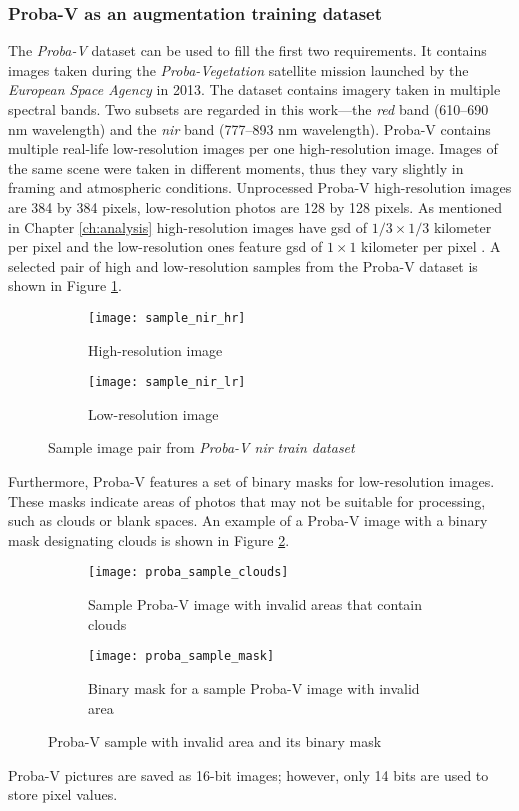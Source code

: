 \subsubsection{Proba-V as an augmentation training dataset}
\label{sec:probav}
The \textit{Proba-V} dataset \cite{esa-proba} can be used to fill the first two requirements.
It contains images taken during the \textit{Proba-Vegetation} satellite mission launched by the \textit{European Space Agency} in 2013.
The dataset contains imagery taken in multiple spectral bands.
Two subsets are regarded in this work---the \textit{\gls{red}} band (610--690 \si{\nano\meter} wavelength) and the \textit{\gls{nir}} band (777--893 \si{\nano\meter} wavelength).
Proba-V contains multiple real-life low-resolution images per one high-resolution image.
Images of the same scene were taken in different moments, thus they vary slightly in framing and atmospheric conditions.
Unprocessed Proba-V high-resolution images are 384 by 384 pixels, low-resolution photos are 128 by 128 pixels.
As mentioned in Chapter \ref{ch:analysis} high-resolution images have \gls{gsd} of $ 1/3 \times 1/3 $ kilometer per pixel and the low-resolution ones feature \gls{gsd} of $ 1 \times 1 $ kilometer per pixel \cite{direckx-2013-proba}.
A selected pair of high and low-resolution samples from the Proba-V dataset is shown in Figure \ref{fig:proba-sample}.
\begin{figure}
    \begin{subfigure}{0.45\textwidth}
        \centering
        \texttt{[image: sample\_nir\_hr]}
        \caption{High-resolution image}
    \end{subfigure}
    \hfill
    \begin{subfigure}{0.45\textwidth}
        \centering
        \texttt{[image: sample\_nir\_lr]}
        \caption{Low-resolution image}
    \end{subfigure}
    \caption{Sample image pair from \textit{Proba-V \gls{nir} train dataset}}
    \label{fig:proba-sample}
\end{figure}
Furthermore, Proba-V features a set of binary masks for low-resolution images.
These masks indicate areas of photos that may not be suitable for processing, such as clouds or blank spaces.
An example of a Proba-V image with a binary mask designating clouds is shown in Figure \ref{fig:proba_sample_mask}.
\begin{figure}
    \begin{subfigure}{0.45\textwidth}
        \centering
        \texttt{[image: proba\_sample\_clouds]}
        \caption{Sample Proba-V image with invalid areas that contain clouds}
    \end{subfigure}
    \hfill
    \begin{subfigure}{0.45\textwidth}
        \centering
        \texttt{[image: proba\_sample\_mask]}
        \caption{Binary mask for a sample Proba-V image with invalid area}
    \end{subfigure}
    \caption{Proba-V sample with invalid area and its binary mask}
    \label{fig:proba_sample_mask}
\end{figure}
Proba-V pictures are saved as 16-bit images; however, only 14 bits are used to store pixel values.

